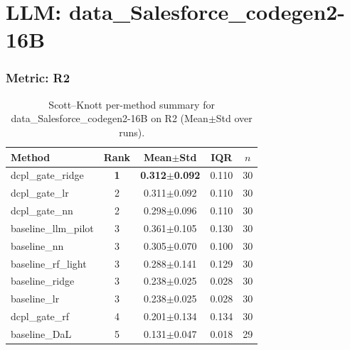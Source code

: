 \section*{LLM: data\_Salesforce\_codegen2-16B}

\subsubsection*{Metric: R2}
\begin{table}[H]
\centering
\scriptsize
\setlength{\tabcolsep}{4pt}
\renewcommand{\arraystretch}{1.1}
\caption{Scott--Knott per-method summary for data\_Salesforce\_codegen2-16B on R2 (Mean$\pm$Std over runs).}
\label{tab:sk_data_Salesforce_codegen2-16B_R2}
\begin{tabular}{l|c|c|c|c}
\hline
\textbf{Method} & \textbf{Rank} & \textbf{Mean$\pm$Std} & \textbf{IQR} & \textbf{$n$} \\
\hline
\rowcolor{red!15} dcpl\_gate\_ridge & \textbf{1} & \textbf{0.312$\pm$0.092} & 0.110 & 30 \\
dcpl\_gate\_lr & 2 & 0.311$\pm$0.092 & 0.110 & 30 \\
dcpl\_gate\_nn & 2 & 0.298$\pm$0.096 & 0.110 & 30 \\
baseline\_llm\_pilot & 3 & 0.361$\pm$0.105 & 0.130 & 30 \\
baseline\_nn & 3 & 0.305$\pm$0.070 & 0.100 & 30 \\
baseline\_rf\_light & 3 & 0.288$\pm$0.141 & 0.129 & 30 \\
baseline\_ridge & 3 & 0.238$\pm$0.025 & 0.028 & 30 \\
baseline\_lr & 3 & 0.238$\pm$0.025 & 0.028 & 30 \\
dcpl\_gate\_rf & 4 & 0.201$\pm$0.134 & 0.134 & 30 \\
baseline\_DaL & 5 & 0.131$\pm$0.047 & 0.018 & 29 \\
\hline
\end{tabular}
\end{table}

